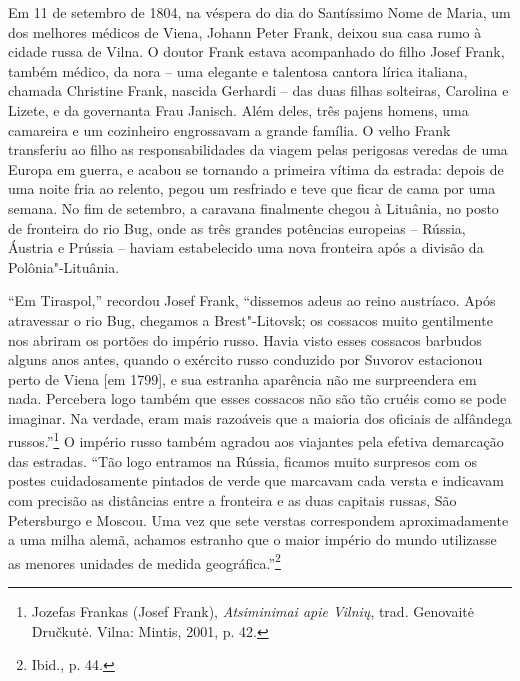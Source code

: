 \begin{epigraphs} 
\end{epigraphs}


Em 11 de setembro de 1804, na véspera do dia do Santíssimo Nome de
Maria, um dos melhores médicos de Viena, 
Johann Peter Frank, deixou sua
casa rumo à cidade russa de Vilna. O doutor Frank estava acompanhado do
filho Josef Frank, também médico, da nora -- uma 
elegante e talentosa cantora lírica italiana, chamada Christine Frank,
nascida Gerhardi -- das
duas filhas solteiras, Carolina e Lizete, e da governanta Frau Janisch.
Além deles, três pajens homens, uma camareira e um cozinheiro
engrossavam a grande família. O velho Frank transferiu ao filho as
responsabilidades da viagem pelas perigosas veredas de uma Europa em
guerra, e acabou se tornando a primeira vítima da estrada: depois de uma
noite fria ao relento, pegou um resfriado e teve que ficar de cama por
uma semana. No fim de setembro, a caravana finalmente chegou à Lituânia,
no posto de fronteira do rio Bug, onde as três grandes potências
europeias -- Rússia, Áustria e Prússia -- haviam estabelecido uma nova
fronteira após a divisão da Polônia"-Lituânia.

``Em Tiraspol,'' recordou Josef Frank, ``dissemos adeus ao reino
austríaco. Após atravessar o rio Bug, chegamos a Brest"-Litovsk; os
cossacos muito gentilmente nos abriram os portões do império russo.
Havia visto esses cossacos barbudos alguns anos antes, quando o exército
russo conduzido por Suvorov estacionou perto de Viena {[}em 1799{]}, e
sua estranha aparência não me surpreendera em nada. Percebera logo
também que esses cossacos não são tão cruéis como se pode imaginar. Na
verdade, eram mais razoáveis que a maioria dos oficiais de alfândega
russos.''\footnote{Jozefas Frankas (Josef Frank), \textit{Atsiminimai apie Vilnių}, trad. Genovaitė Dručkutė. Vilna: Mintis, 2001, p. 42.} O império russo também agradou aos viajantes pela efetiva demarcação das
estradas. ``Tão logo entramos na Rússia, ficamos muito surpresos com os
postes cuidadosamente pintados de verde que marcavam cada versta e
indicavam com precisão as distâncias entre a fronteira e as duas
capitais russas, São Petersburgo e Moscou. Uma vez que sete verstas
correspondem aproximadamente a uma milha alemã, achamos estranho que o
maior império do mundo utilizasse as menores unidades de medida
geográfica.''\footnote{Ibid., p. 44.}

